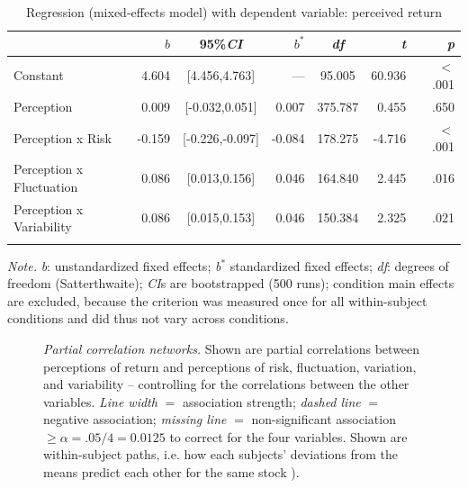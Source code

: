 \documentclass[a4paper,man, natbib,floatsintext]{apa6} %
\begin{document}
\begin{table}[H]
\begin{center}
\begin{threeparttable}
\caption{Regression (mixed-effects model) with dependent variable: perceived return \\\label{study1:mixed_effects_model}}
    \begin{tabular}{lrcrcrr}
    \toprule
     & $b$ & 95\%\textit{CI} & $b^*$ & \textit{df} & \textit{t} & \textit{p}\\
    \midrule
    Constant & 4.604 & [4.456,4.763] & --- & 95.005 & 60.936 & $<$ .001\\
    Perception & 0.009 & [-0.032,0.051] & 0.007 & 375.787 & 0.455 & .650\\
    Perception x Risk & -0.159 & [-0.226,-0.097]  & -0.084 & 178.275 & -4.716 & $<$ .001\\
    Perception x Fluctuation & 0.086 & [0.013,0.156] & 0.046 & 164.840 & 2.445 & .016\\
    Perception x Variability & 0.086 & [0.015,0.153] & 0.046 & 150.384 & 2.325 & .021\\
    \bottomrule
    \addlinespace
    \end{tabular}
\begin{tablenotes}[para]
\normalsize{\textit{Note.} \textit{b}: unstandardized fixed effects; \textit{b}$^*$ standardized fixed effects; \textit{df}: degrees of freedom (Satterthwaite); \textit{CI}s are bootstrapped (500 runs); condition main effects are excluded, because the criterion was measured once for all within-subject conditions and did thus not vary across conditions.}
\end{tablenotes}
\end{threeparttable}
\end{center}
\end{table}

\begin{figure}[H] 
 \centering
  \caption{\textit{Partial correlation networks.} Shown are partial correlations between perceptions of return and perceptions of risk, fluctuation, variation, and variability --  controlling for the correlations between the other variables. \textit{Line width} $=$ association strength; \textit{dashed line} $=$ negative association; \textit{missing line} $=$ non-significant association  $\geq \alpha=.05/4=0.0125$ to correct for the four variables. Shown are within-subject paths, i.e. how each subjects' deviations from the means predict each other for the same stock \citep[contemporeanous effects, ][]{Epskamp2018}).}
  \label{fig:pcn}
\end{figure}
\end{document}
